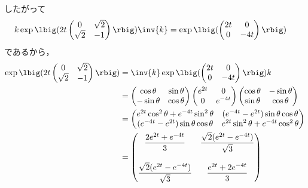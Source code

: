 \begin{npfwn}
  したがって
  \begin{align*}
    k\exp\lbig(2t\begin{pmatrix}
      0 & \sqrt{2} \\
      \sqrt{2} & -1 
    \end{pmatrix}\rbig)\inv{k} &= \exp\lbig(
                                 \begin{pmatrix}
                                   2t & 0 \\ 0 & -4t
                                 \end{pmatrix}\rbig)
  \end{align*}
  であるから，
  \begin{align*}
    \exp\lbig(2t\begin{pmatrix}
      0 & \sqrt{2} \\
      \sqrt{2} & -1 
    \end{pmatrix}\rbig) &= \inv{k} \exp\lbig(
                                 \begin{pmatrix}
                                   2t & 0 \\ 0 & -4t
                                 \end{pmatrix}\rbig)k\\
        &=
          \begin{pmatrix}
            \cos \theta  & \sin \theta \\ -\sin \theta & \cos \theta
          \end{pmatrix}
                                                         \begin{pmatrix}
                                                           e^{2t} & 0 \\ 0 & e^{-4t}
                                                         \end{pmatrix}
                                                                             \begin{pmatrix}
                                                                               \cos \theta  & -\sin \theta \\ \sin \theta & \cos \theta
                                                                             \end{pmatrix}\\
        &=
          \begin{pmatrix}
            e^{2t}\cos^2\theta + e^{-4t}\sin^2 \theta  & (e^{-4t} - e^{2t})\sin\theta \cos\theta \\ (e^{-4t} - e^{2t})\sin\theta \cos\theta  & e^{2t}\sin^2\theta +e^{-4t}\cos^2\theta
          \end{pmatrix}\\
        &= \begin{pmatrix}
          \dfrac{2e^{2t} + e^{-4t}}{3} &  \dfrac{\sqrt{2} (e^{2t} - e^{-4t})}{\sqrt{3}}\\
          \\
          \dfrac{\sqrt{2} (e^{2t} - e^{-4t})}{\sqrt{3}} & \dfrac{e^{2t} + 2e^{-4t}}{3}
                 \end{pmatrix}
  \end{align*}
\end{npfwn}

